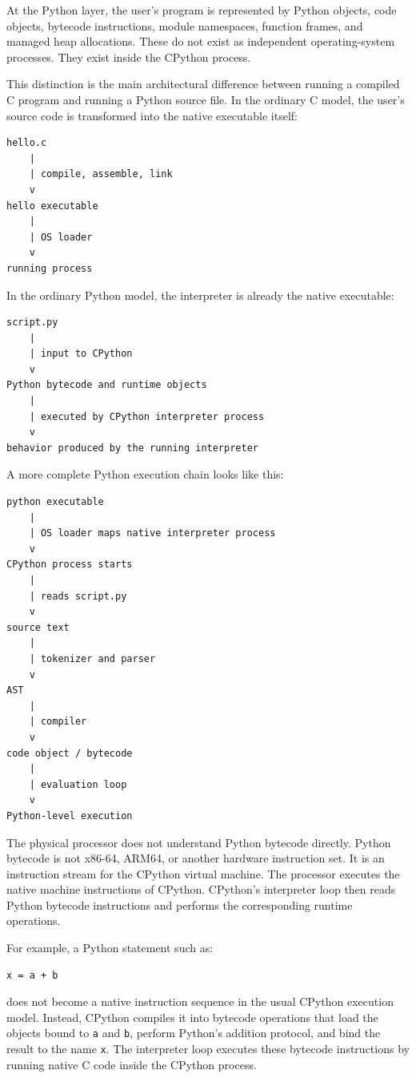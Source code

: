 \documentclass[a4paper,twoside]{report}
\begin{document}
At the Python layer, the user's program is represented by Python objects, code objects, bytecode instructions, module namespaces, function frames, and managed heap allocations. These do not exist as independent operating-system processes. They exist inside the CPython process.

This distinction is the main architectural difference between running a compiled C program and running a Python source file. In the ordinary C model, the user's source code is transformed into the native executable itself:

\begin{verbatim}
hello.c
    |
    | compile, assemble, link
    v
hello executable
    |
    | OS loader
    v
running process
\end{verbatim}

In the ordinary Python model, the interpreter is already the native executable:

\begin{verbatim}
script.py
    |
    | input to CPython
    v
Python bytecode and runtime objects
    |
    | executed by CPython interpreter process
    v
behavior produced by the running interpreter
\end{verbatim}

A more complete Python execution chain looks like this:

\begin{verbatim}
python executable
    |
    | OS loader maps native interpreter process
    v
CPython process starts
    |
    | reads script.py
    v
source text
    |
    | tokenizer and parser
    v
AST
    |
    | compiler
    v
code object / bytecode
    |
    | evaluation loop
    v
Python-level execution
\end{verbatim}

The physical processor does not understand Python bytecode directly. Python bytecode is not x86-64, ARM64, or another hardware instruction set. It is an instruction stream for the CPython virtual machine. The processor executes the native machine instructions of CPython. CPython's interpreter loop then reads Python bytecode instructions and performs the corresponding runtime operations.

For example, a Python statement such as:

\begin{verbatim}
x = a + b
\end{verbatim}

does not become a native instruction sequence in the usual CPython execution model. Instead, CPython compiles it into bytecode operations that load the objects bound to \texttt{a} and \texttt{b}, perform Python's addition protocol, and bind the result to the name \texttt{x}. The interpreter loop executes these bytecode instructions by running native C code inside the CPython process.
\end{document}
